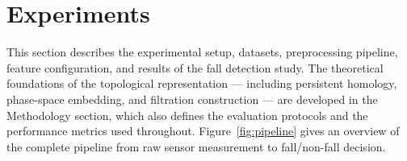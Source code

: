 \chapter{Experiments}
\label{sec:experiments}

This section describes the experimental setup, datasets, preprocessing pipeline, feature configuration, and results of the fall detection study. The theoretical foundations of the topological representation --- including persistent homology, phase-space embedding, and filtration construction --- are developed in the Methodology section, which also defines the evaluation protocols and the performance metrics used throughout. Figure~\ref{fig:pipeline} gives an overview of the complete pipeline from raw sensor measurement to fall/non-fall decision.

